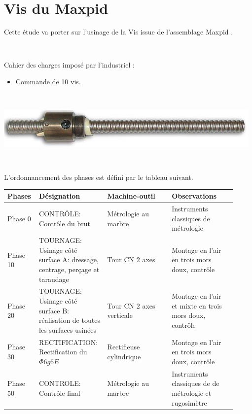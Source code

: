 



\section{Vis du Maxpid}

Cette étude va porter sur l'usinage de la \og Vis \fg issue de l'assemblage \og Maxpid \fg.

~\

Cahier des charges imposé par l'industriel :
\begin{itemize}
 \item Commande de 10 vis.
\end{itemize}
~\

\begin{center}
 \includegraphics[width=0.7\linewidth]{img/Vis.jpg}
\end{center}

~\

L'ordonnancement des phases est défini par le tableau suivant.

\tiny

\begin{table}[!h]
 \begin{tabular}{|m{0.11\linewidth}|m{0.27\linewidth}|m{0.27\linewidth}|m{0.27\linewidth}|}
 \hline
 Phases & Désignation & Machine-outil & Observations \\
 \hline
 Phase 0 & CONTRÔLE: Contrôle du brut & Métrologie au marbre & Instruments classiques de métrologie \\
 \hline
 Phase 10 & TOURNAGE: Usinage côté surface A: dressage, centrage, perçage et taraudage & Tour CN 2 axes & Montage en l'air en trois mors doux, contrôle \\
 \hline
 Phase 20 & TOURNAGE: Usinage côté surface B: réalisation de toutes les surfaces usinées & Tour CN 2 axes verticale & Montage en l'air et mixte en trois mors doux, contrôle \\
 \hline
 Phase 30 & RECTIFICATION: Rectification du $\Phi 6g6E$ & Rectifieuse cylindrique & Montage en l'air en trois mors doux, contrôle \\
 \hline
 Phase 50 & CONTROLE: Contrôle final & Métrologie au marbre & Instruments classiques de de métrologie et rugosimètre \\
 \hline
 \end{tabular}
\end{table}

